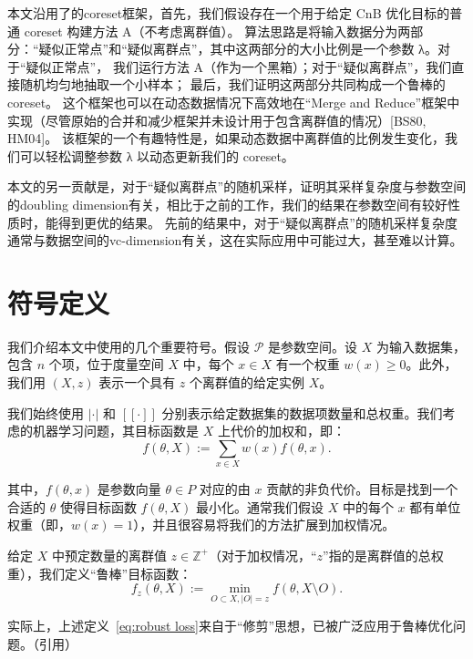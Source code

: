 本文沿用了\citet{Wang2021RobustAF}的coreset框架，首先，我们假设存在一个用于给定 CnB 优化目标的普通 coreset 构建方法 A（不考虑离群值）。
算法思路是将输入数据分为两部分：“疑似正常点”和“疑似离群点”，其中这两部分的大小比例是一个参数 λ。对于“疑似正常点”，
我们运行方法 A（作为一个黑箱）；对于“疑似离群点”，我们直接随机均匀地抽取一个小样本；
最后，我们证明这两部分共同构成一个鲁棒的 coreset。
这个框架也可以在动态数据情况下高效地在“Merge and Reduce”框架中实现（尽管原始的合并和减少框架并未设计用于包含离群值的情况）[BS80, HM04]。
该框架的一个有趣特性是，如果动态数据中离群值的比例发生变化，我们可以轻松调整参数 λ 以动态更新我们的 coreset。

本文的另一贡献是，对于“疑似离群点”的随机采样，证明其采样复杂度与参数空间的doubling dimension有关，相比于之前的工作，我们的结果在参数空间有较好性质时，能得到更优的结果。
先前的结果中，对于“疑似离群点”的随机采样复杂度通常与数据空间的vc-dimension有关，这在实际应用中可能过大，甚至难以计算。




\section{符号定义}


我们介绍本文中使用的几个重要符号。假设 $\mathcal{P}$ 是参数空间。设 $X$ 为输入数据集，包含 $n$ 个项，位于度量空间 $X$ 中，每个 $x \in X$ 有一个权重 $w(x) \geq 0$。此外，我们用 $(X, z)$ 表示一个具有 $z$ 个离群值的给定实例 $X$。

我们始终使用 $| \cdot |$ 和 $[[ \cdot ]]$ 分别表示给定数据集的数据项数量和总权重。我们考虑的机器学习问题，其目标函数是 $X$ 上代价的加权和，即：
\begin{equation}
f(\theta, X) := \sum_{x \in X} w(x) f(\theta, x).
\label{eq:loss}
\end{equation}

其中，$f(\theta, x)$ 是参数向量 $\theta \in P$ 对应的由 $x$ 贡献的非负代价。目标是找到一个合适的 $\theta$ 使得目标函数 $f(\theta, X)$ 最小化。通常我们假设 $X$ 中的每个 $x$ 都有单位权重（即，$w(x) = 1$），并且很容易将我们的方法扩展到加权情况。

给定 $X$ 中预定数量的离群值 $z \in \mathbb{Z}^+$（对于加权情况，“$z$”指的是离群值的总权重），我们定义“鲁棒”目标函数：
\begin{equation}
f_z(\theta, X) := \min_{O \subset X, |O| = z} f(\theta, X \setminus O).
\label{eq:robust loss}
\end{equation}

实际上，上述定义~\eqref{eq:robust loss}来自于“修剪”思想，已被广泛应用于鲁棒优化问题。（引用）

